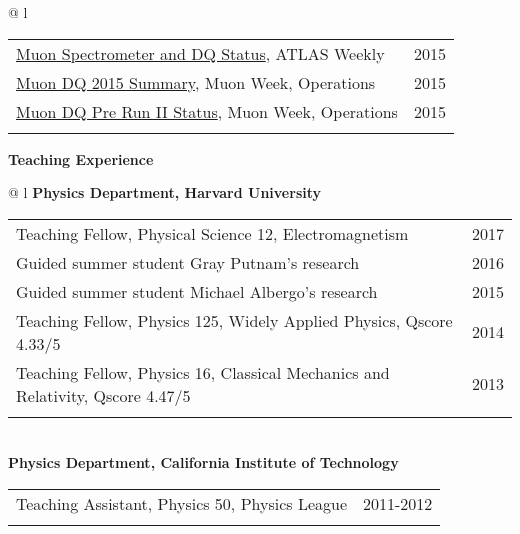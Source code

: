 \documentclass[letterpaper,11pt,oneside]{article}
\newcommand{\blue}[1]{\textcolor[rgb]{0,0,0.9}{#1}}
\begin{document}
\begin{flushleft}
\begin{tabular}{@{} l}
\begin{tabular}{@{} l l }
     \blue{\href{https://indico.cern.ch/event/444054/contributions/1099850}{Muon Spectrometer and DQ Status}}, ATLAS Weekly & 2015\\
     \blue{\href{https://indico.cern.ch/event/464848/contributions/1983327}{Muon DQ 2015 Summary}}, Muon Week, Operations & 2015\\
     \blue{\href{https://indico.cern.ch/event/376175/contributions/893495}{Muon DQ Pre Run II Status}}, Muon Week, Operations & 2015\\
     \hspace{0.8\linewidth} & \hspace{0.1\linewidth} \\
      \end{tabular}
      \end{tabular}
\end{flushleft}
\vspace{-0.25cm}
\raggedright
\textbf{\Large{Teaching Experience}} \\
\vspace{-0.5cm}
 \normalsize
\begin{flushleft}
\hspace{1cm}
 \begin{tabular}{@{} l}
    \textbf{Physics Department, Harvard University} \\ 
    \begin{tabular}{@{} l l }
 Teaching Fellow, Physical Science 12, Electromagnetism  & 2017\\
 Guided summer student Gray Putnam's research & 2016\\
 Guided summer student Michael Albergo's research & 2015\\
 Teaching Fellow, Physics 125, Widely Applied Physics, Qscore 4.33/5  & 2014\\
 Teaching Fellow, Physics 16, Classical Mechanics and Relativity, Qscore 4.47/5 & 2013\\
    \hspace{0.8\linewidth} & \hspace{0.1\linewidth} \\
     \end{tabular}
     \\
     \textbf{Physics Department, California Institute of Technology} \\
     \begin{tabular}{@{} l l }
 Teaching Assistant, Physics 50, Physics League & 2011-2012\\
    \hspace{0.8\linewidth} & \hspace{0.1\linewidth} \\
      \end{tabular}
      \end{tabular}
\end{flushleft}
\end{document}
